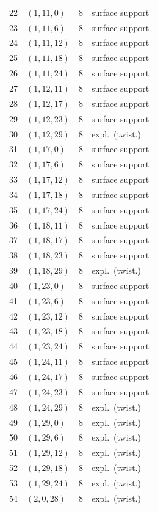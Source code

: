\documentclass[11pt]{amsart}
\theoremstyle{remark}\newtheorem{remark}[theorem]{Remark}
\begin{document}
{\begin{longtable}{rlrl}
22 & $(1,11,0)$ & 8 & surface support\\
23 & $(1,11,6)$ & 8 & surface support\\
24 & $(1,11,12)$ & 8 & surface support\\
25 & $(1,11,18)$ & 8 & surface support\\
26 & $(1,11,24)$ & 8 & surface support\\
27 & $(1,12,11)$ & 8 & surface support\\
28 & $(1,12,17)$ & 8 & surface support\\
29 & $(1,12,23)$ & 8 & surface support\\
30 & $(1,12,29)$ & 8 & expl.\ (twist.)\\
31 & $(1,17,0)$ & 8 & surface support\\
32 & $(1,17,6)$ & 8 & surface support\\
33 & $(1,17,12)$ & 8 & surface support\\
34 & $(1,17,18)$ & 8 & surface support\\
35 & $(1,17,24)$ & 8 & surface support\\
36 & $(1,18,11)$ & 8 & surface support\\
37 & $(1,18,17)$ & 8 & surface support\\
38 & $(1,18,23)$ & 8 & surface support\\
39 & $(1,18,29)$ & 8 & expl.\ (twist.)\\
40 & $(1,23,0)$ & 8 & surface support\\
41 & $(1,23,6)$ & 8 & surface support\\
42 & $(1,23,12)$ & 8 & surface support\\
43 & $(1,23,18)$ & 8 & surface support\\
44 & $(1,23,24)$ & 8 & surface support\\
45 & $(1,24,11)$ & 8 & surface support\\
46 & $(1,24,17)$ & 8 & surface support\\
47 & $(1,24,23)$ & 8 & surface support\\
48 & $(1,24,29)$ & 8 & expl.\ (twist.)\\
49 & $(1,29,0)$ & 8 & expl.\ (twist.)\\
50 & $(1,29,6)$ & 8 & expl.\ (twist.)\\
51 & $(1,29,12)$ & 8 & expl.\ (twist.)\\
52 & $(1,29,18)$ & 8 & expl.\ (twist.)\\
53 & $(1,29,24)$ & 8 & expl.\ (twist.)\\
54 & $(2,0,28)$ & 8 & expl.\ (twist.)\\

\end{longtable}}
\end{document}
